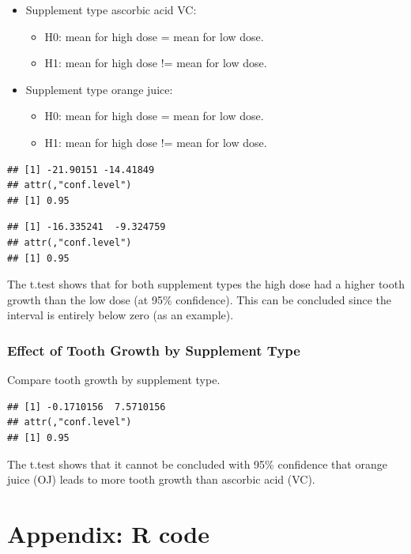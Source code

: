 \documentclass[]{article}
\providecommand{\tightlist}{%
  \setlength{\itemsep}{0pt}\setlength{\parskip}{0pt}}
\begin{document}
\begin{itemize}
\tightlist
\item
  Supplement type ascorbic acid VC:

  \begin{itemize}
  \tightlist
  \item
    H0: mean for high dose = mean for low dose.
  \item
    H1: mean for high dose != mean for low dose.
  \end{itemize}
\item
  Supplement type orange juice:

  \begin{itemize}
  \tightlist
  \item
    H0: mean for high dose = mean for low dose.
  \item
    H1: mean for high dose != mean for low dose.
  \end{itemize}
\end{itemize}

\begin{verbatim}
## [1] -21.90151 -14.41849
## attr(,"conf.level")
## [1] 0.95
\end{verbatim}

\begin{verbatim}
## [1] -16.335241  -9.324759
## attr(,"conf.level")
## [1] 0.95
\end{verbatim}

The t.test shows that for both supplement types the high dose had a
higher tooth growth than the low dose (at 95\% confidence). This can be
concluded since the interval is entirely below zero (as an example).

\subsubsection{Effect of Tooth Growth by Supplement
Type}\label{effect-of-tooth-growth-by-supplement-type}

Compare tooth growth by supplement type.

\begin{verbatim}
## [1] -0.1710156  7.5710156
## attr(,"conf.level")
## [1] 0.95
\end{verbatim}

The t.test shows that it cannot be concluded with 95\% confidence that
orange juice (OJ) leads to more tooth growth than ascorbic acid (VC).

\pagebreak

\section{Appendix: R code}\label{appendix-r-code}
\end{document}
